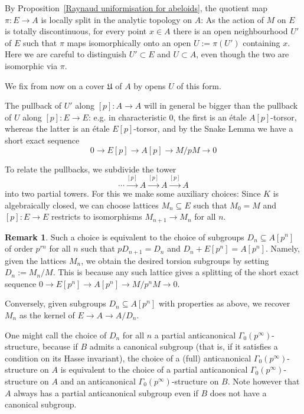 \documentclass[10pt,oneside]{amsart}
\theoremstyle{definition}
\newtheorem{remark}[theorem]{Remark}
\begin{document}
By Proposition~\ref{Raynaud uniformisation for abeloids}, the quotient map $\pi\colon E\to A$ is locally split in the analytic topology on $A$: As the action of $M$ on $E$ is totally discontinuous, for every point  $x\in A$ there is an open neighbourhood $U'$ of $E$ such that $\pi$ maps isomorphically onto an open $U:=\pi(U')$ containing $x$. Here we are careful to distinguish $U'\subset E$ and $U\subset A$, even though the two are isomorphic via $\pi$.

We fix from now on a cover $\mathfrak U$ of $A$ by opens $U$ of this form.

The pullback of $U'$ along $[p]\colon A\to A$ will in general be bigger than the pullback of $U$ along $[p]:E\to E$: e.g. in characteristic 0, the first is an \'etale $A[p]$-torsor, whereas  the latter is an \'etale $E[p]$-torsor, and by the Snake Lemma we have a short exact sequence
\[0\to E[p]\to A[p]\to M/pM\to 0\]

To relate the pullbacks, we subdivide the tower 
\[
\cdots\xrightarrow{[p]}A \xrightarrow{[p]}A\xrightarrow{[p]}A
\]
into two partial towers. For this we make some auxiliary choices: Since $K$ is algebraically closed, we can choose lattices $M_n\subseteq E$ such that $M_0=M$ and $[p]\colon E\rightarrow E$ restricts to isomorphisms $M_{n+1}\rightarrow M_n$ for all $n$.
	
	\begin{remark}\label{remark: Definition of the D_n}
		Such a choice is equivalent to the choice of subgroups $D_n\subseteq A[p^n]$ of order $p^{rn}$ for all $n$ such that $pD_{n+1}=D_n$ and $D_n+E[p^n]=A[p^n]$. Namely,
		given the lattices $M_{n}$, we obtain the desired torsion subgroups by setting $D_n:=M_{n}/M$. This is because any such lattice gives a splitting of the short exact sequence $0\rightarrow E[p^n]\rightarrow A[p^n]\rightarrow M/p^nM \rightarrow 0$.
		
		Conversely, given subgroups $D_n\subseteq A[p^n]$ with properties as above, we recover $M_n$ as the kernel of $E\rightarrow A\rightarrow A/D_n$.
		
		One might call the choice of $D_n$ for all $n$ a partial anticanonical $\Gamma_0(p^\infty)$-structure, because if $B$ admits a canonical subgroup (that is, if it satisfies a condition on its Hasse invariant), the choice of a (full) anticanonical $\Gamma_0(p^\infty)$-structure on $A$ is equivalent to the choice of a partial anticanonical $\Gamma_0(p^\infty)$-structure on $A$ and an anticanonical $\Gamma_0(p^\infty)$-structure on $B$. Note however that $A$ always has a partial anticanonical subgroup even if $B$ does not have a canonical subgroup.
	\end{remark}
	
\end{document}

